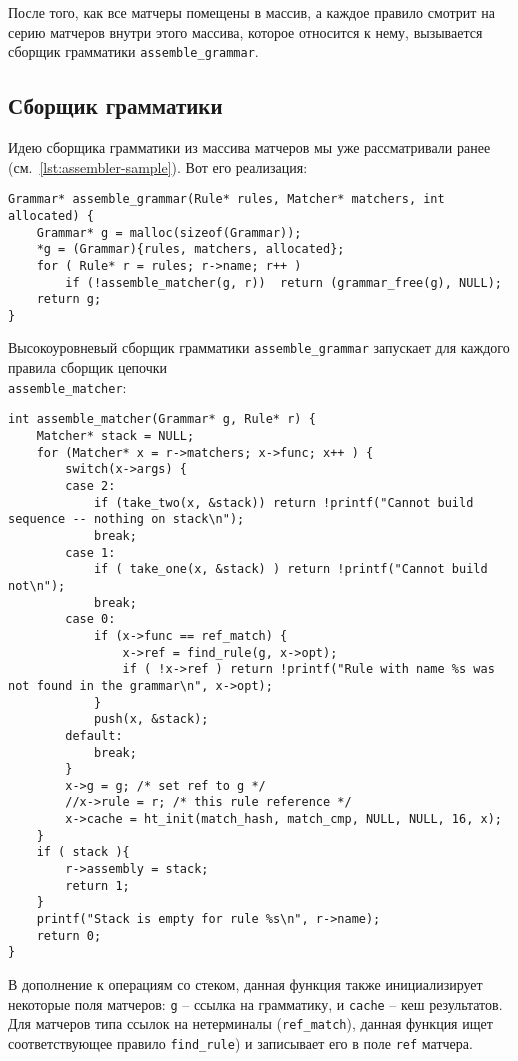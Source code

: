\documentclass[10pt]{report}
\begin{document}
После того, как все матчеры помещены в массив, а каждое правило смотрит на серию матчеров внутри этого массива, которое относится к нему, вызывается сборщик грамматики {\tt assemble\_grammar}.  
\subsection{Сборщик грамматики}
Идею сборщика грамматики из массива матчеров мы уже рассматривали ранее (см.~\autoref{lst:assembler-sample}).
Вот его реализация:
\begin{lstlisting}[firstnumber=171, caption=packrat.c -- Сборщик грамматики]
Grammar* assemble_grammar(Rule* rules, Matcher* matchers, int allocated) {
	Grammar* g = malloc(sizeof(Grammar));
	*g = (Grammar){rules, matchers, allocated};
	for ( Rule* r = rules; r->name; r++ ) 
		if (!assemble_matcher(g, r))  return (grammar_free(g), NULL);
	return g;
}
\end{lstlisting} 
Высокоуровневый сборщик грамматики {\tt assemble\_grammar} запускает для каждого правила сборщик цепочки\\ {\tt assemble\_matcher}:
\begin{lstlisting}[firstnumber=140, caption=packrat.c -- сборщик цепочки для правила]
int assemble_matcher(Grammar* g, Rule* r) {
	Matcher* stack = NULL;
	for (Matcher* x = r->matchers; x->func; x++ ) {
		switch(x->args) {
		case 2:
			if (take_two(x, &stack)) return !printf("Cannot build sequence -- nothing on stack\n");
			break;
		case 1:
			if ( take_one(x, &stack) ) return !printf("Cannot build not\n");
			break;
		case 0:
			if (x->func == ref_match) {
				x->ref = find_rule(g, x->opt);
				if ( !x->ref ) return !printf("Rule with name %s was not found in the grammar\n", x->opt);
			}
			push(x, &stack);
		default:
			break;
		}
		x->g = g; /* set ref to g */
		//x->rule = r; /* this rule reference */
		x->cache = ht_init(match_hash, match_cmp, NULL, NULL, 16, x);
	}
	if ( stack ){
		r->assembly = stack;
		return 1;
	}
	printf("Stack is empty for rule %s\n", r->name);
	return 0;
}
\end{lstlisting}
В дополнение к операциям со стеком, данная функция также инициализирует некоторые поля матчеров: {\tt g}  -- ссылка на грамматику, и {\tt cache} -- кеш результатов.
Для матчеров типа ссылок на нетерминалы ({\tt ref\_match}), данная функция ищет соответствующее правило {\tt find\_rule}) и записывает его в поле {\tt ref} матчера.
\end{document}
